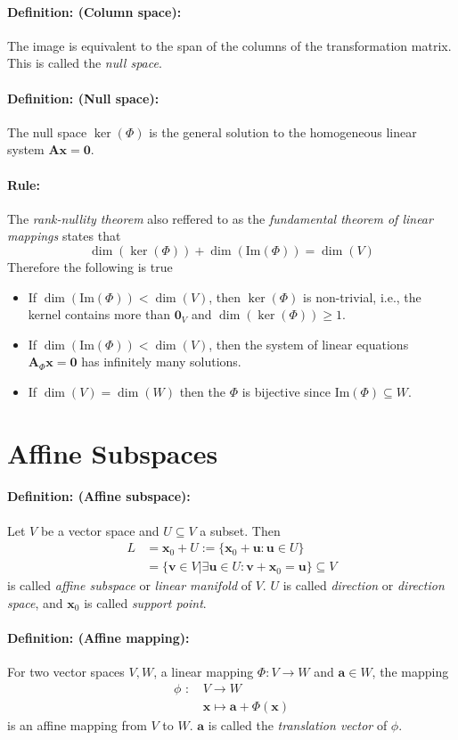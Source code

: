 \documentclass[12pt]{article}
\newcommand{\A}{{\bm{A}}}
\newcommand{\xdefinition}[2]{\paragraph{\colorbox{#1!30}{\textbf{Definition:}} (#2):}}
\newcommand{\xrule}[1]{\paragraph{\colorbox{#1!30}{\textbf{Rule:}}}}
\begin{document}
\xdefinition{red}{Column space} The image is equivalent to the span of the columns of the transformation matrix. This is called the \textit{null space}.

\xdefinition{red}{Null space} The null space $\ker(\Phi)$ is the general solution to the homogeneous linear system $\A \bm{x} = \bm{0}$.

\xrule{red} The \textit{rank-nullity theorem} also reffered to as the \textit{fundamental theorem of linear mappings} states that
%
\begin{equation}
	\dim(\ker(\Phi)) + \dim(\text{Im}(\Phi)) = \dim(V)
\end{equation}
%
Therefore the following is true
%
\begin{itemize}
	\item If $\dim(\text{Im}(\Phi)) < \dim(V)$, then $\ker(\Phi)$ is non-trivial, i.e., the kernel contains more than $\bm{0}_V$ and $\dim(\ker(\Phi)) \geqslant 1$.
	\item If $\dim(\text{Im}(\Phi)) < \dim(V)$, then the system of linear equations $\A_\Phi \bm{x} = \bm{0}$ has infinitely many solutions.
	\item If $\dim(V) = \dim(W)$ then the $\Phi$ is bijective since $\text{Im}(\Phi) \subseteq W$.
\end{itemize}

\section{Affine Subspaces}

\xdefinition{red}{Affine subspace} Let $V$ be a vector space and $U \subseteq V$ a subset. Then
%
\begin{equation}
\begin{aligned}
	L &= \bm{x}_0 + U := \{ \bm{x}_0 + \bm{u} : \bm{u} \in U\} \\
	  &= \{ \bm{v} \in V| \exists \bm{u} \in U : \bm{v} + \bm{x}_0 = \bm{u} \} \subseteq V
\end{aligned}
\end{equation}
%
is called \textit{affine subspace} or \textit{linear manifold} of $V$. $U$ is called \textit{direction} or \textit{direction space}, and $\bm{x}_0$ is called \textit{support point}.

\xdefinition{red}{Affine mapping} For two vector spaces $V, W$, a linear mapping $\Phi : V \rightarrow W$ and $\bm{a} \in W$, the mapping
%
\begin{equation}
\begin{aligned}
	\phi \text{ : }& V \rightarrow W \\
	              & \bm{x} \mapsto \bm{a} + \Phi(\bm{x})
\end{aligned}
\end{equation}
%
is an affine mapping from $V$ to $W$. $\bm{a}$ is called the \textit{translation vector} of $\phi$.
\end{document}
